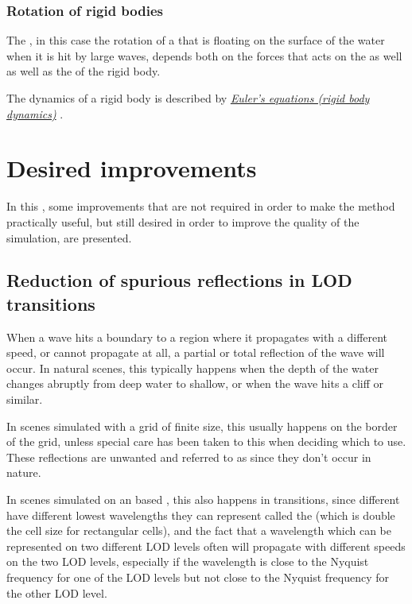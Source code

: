 \subsubsection{Rotation of rigid bodies}

The , in this case the rotation of a \ship that is floating on the surface of the water when it is hit by large waves, depends both on the forces that acts on the  as well as well as the   of the rigid body.

The dynamics of a rigid body is described by \textit{\href{http://en.wikipedia.org/wiki/Euler\%27s_equations_\%28rigid_body_dynamics\%29}{Euler's equations (rigid body dynamics)}} \citep{temp}.

\section{Desired improvements}

In this \levelname, some improvements that are not required in order to make the method practically useful, but still desired in order to improve the quality of the simulation, are presented.

\subsection{Reduction of spurious reflections in LOD transitions}

When a wave hits a boundary to a region where it propagates with a different speed, or cannot propagate at all, a partial or total reflection of the wave will occur. In natural scenes, this typically happens when the depth of the water changes abruptly from deep water to shallow, or when the wave hits a cliff or similar.

In scenes simulated with a grid of finite size, this usually happens on the border of the grid, unless special care has been taken to this when deciding which  to use. These reflections are unwanted and referred to as  since they don't occur in nature.

In scenes simulated on an \octree based \grid, this also happens in \LOD transitions, since different  have different lowest wavelengths they can represent called the  (which is double the cell size for rectangular cells), and the fact that a wavelength which can be represented on two different LOD levels often will propagate with different speeds on the two LOD levels, especially if the wavelength is close to the Nyquist frequency for one of the LOD levels but not close to the Nyquist frequency for the other LOD level.

